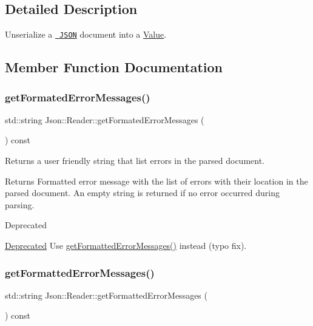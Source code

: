 \subsection{Detailed Description}
Unserialize a \href{http://www.json.org}{\texttt{ J\+S\+ON}} document into a \mbox{\hyperlink{class_json_1_1_value}{Value}}. 



\subsection{Member Function Documentation}
\mbox{\label{class_json_1_1_reader_a269793929575f925b629460c9c744da1}} 
\subsubsection{\texorpdfstring{getFormatedErrorMessages()}{getFormatedErrorMessages()}}
{\footnotesize\ttfamily std\+::string Json\+::\+Reader\+::get\+Formated\+Error\+Messages (\begin{DoxyParamCaption}{ }\end{DoxyParamCaption}) const}



Returns a user friendly string that list errors in the parsed document. 

\begin{DoxyReturn}{Returns}
Formatted error message with the list of errors with their location in the parsed document. An empty string is returned if no error occurred during parsing. 
\end{DoxyReturn}
\begin{DoxyRefDesc}{Deprecated}
\item[\mbox{\hyperlink{deprecated__deprecated000001}{Deprecated}}]Use \mbox{\hyperlink{class_json_1_1_reader_a5e624688f0794da1e737d2a15aa5cb84}{get\+Formatted\+Error\+Messages()}} instead (typo fix). \end{DoxyRefDesc}
\mbox{\label{class_json_1_1_reader_a5e624688f0794da1e737d2a15aa5cb84}} 
\subsubsection{\texorpdfstring{getFormattedErrorMessages()}{getFormattedErrorMessages()}}
{\footnotesize\ttfamily std\+::string Json\+::\+Reader\+::get\+Formatted\+Error\+Messages (\begin{DoxyParamCaption}{ }\end{DoxyParamCaption}) const}



